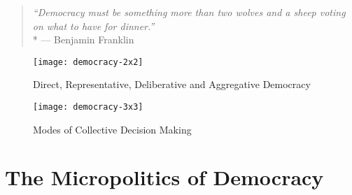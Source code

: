 
\begin{quote}
	\emph{``Democracy must be something more than two wolves and a sheep voting on what to have for dinner.''}
	\\*
	--- Benjamin Franklin
\end{quote}






 \begin{figure}[htbp]
	\centering
	\texttt{[image: democracy-2x2]}
	\caption{Direct, Representative, Deliberative and Aggregative Democracy}
	\label{fig:democracy-2x2}
\end{figure}

 \begin{figure}[htbp]
	\centering
	\texttt{[image: democracy-3x3]}
	\caption{Modes of Collective Decision Making}
	\label{fig:democracy-3x3}
\end{figure}

\section[Micropolitics]{The Micropolitics of Democracy} %

